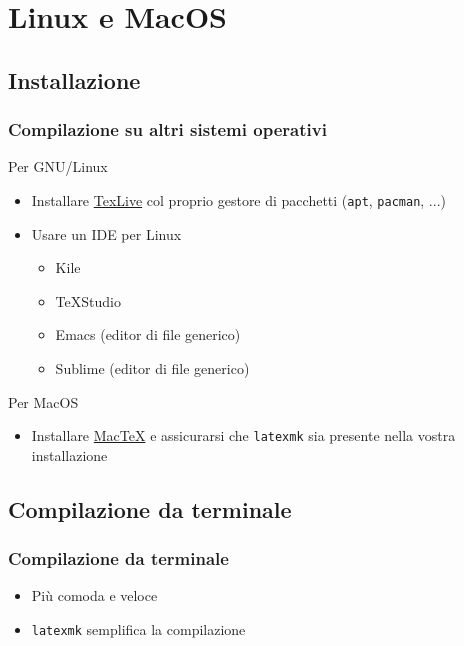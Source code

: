 \section{Linux e MacOS}
\subsection{Installazione}
\begin{frame}
  \frametitle{Compilazione su altri sistemi operativi}
  
  Per GNU/Linux
  \begin{itemize}
   \item Installare \href{http://www.tug.org/texlive/}{TexLive} col proprio 
gestore di pacchetti (\texttt{apt}, \texttt{pacman}, ...)
   \item Usare un IDE per Linux
   \begin{itemize}
    \item Kile
    \item TeXStudio
    \item Emacs (editor di file generico)
    \item Sublime (editor di file generico)
   \end{itemize}
  \end{itemize}
  
  Per MacOS
  \begin{itemize}
   \item Installare \href{http://www.tug.org/mactex/}{MacTeX} e assicurarsi che 
\texttt{latexmk} sia presente nella vostra installazione 
  \end{itemize}
\end{frame}


\subsection{Compilazione da terminale}
\begin{frame}
 \frametitle{Compilazione da terminale}
 
 \begin{itemize}
  \item Più comoda e veloce
  \item \texttt{latexmk} semplifica la compilazione
 \end{itemize}
 

\end{frame}
